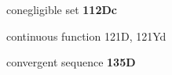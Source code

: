 conegligible set {\bf 112Dc}



































continuous function 121D, 121Yd

















































{convergent }
sequence {\bf 135D}







































